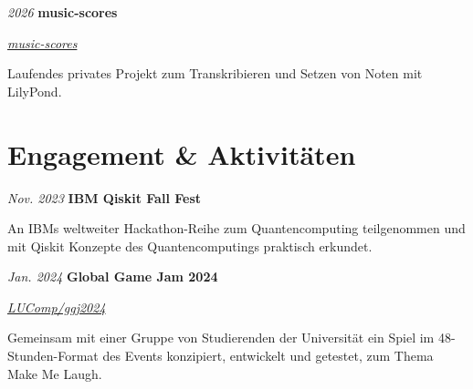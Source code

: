 \documentclass[german]{cv}
\begin{document}
        \vspace{0.13 cm}

        \begin{twocolentry}{
        \textit{2026}}
            \textbf{music-scores}

            \textit{\href{https://github.com/prosk-sudo/music-scores}{music-scores}}
        \end{twocolentry}

        \vspace{0.10 cm}
        \begin{onecolentry}
            \begin{highlights}
                \item Laufendes privates Projekt zum Transkribieren und Setzen von Noten mit LilyPond.
            \end{highlights}
        \end{onecolentry}

    \section{Engagement \& Aktivitäten}

        \begin{twocolentry}{
        \textit{Nov. 2023}}
            \textbf{IBM Qiskit Fall Fest}
        \end{twocolentry}

        \vspace{0.10 cm}
        \begin{onecolentry}
            \begin{highlights}
                \item An IBMs weltweiter Hackathon-Reihe zum Quantencomputing teilgenommen und mit Qiskit Konzepte des Quantencomputings praktisch erkundet.
            \end{highlights}
        \end{onecolentry}

        \vspace{0.13 cm}

        \begin{twocolentry}{
        \textit{Jan. 2024}}
            \textbf{Global Game Jam 2024}

            \textit{\href{https://github.com/LUComp/ggj2024}{LUComp/ggj2024}}
        \end{twocolentry}

        \vspace{0.10 cm}
        \begin{onecolentry}
            \begin{highlights}
                \item Gemeinsam mit einer Gruppe von Studierenden der Universität ein Spiel im 48-Stunden-Format des Events konzipiert, entwickelt und getestet, zum Thema \glqq Make Me Laugh\grqq.
            \end{highlights}
        \end{onecolentry}
\end{document}
